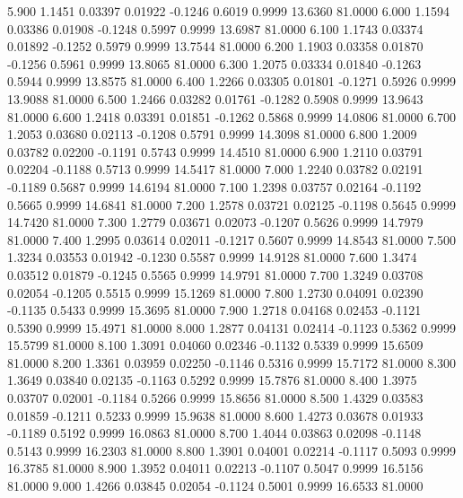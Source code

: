    5.900   1.1451   0.03397   0.01922  -0.1246   0.6019   0.9999  13.6360  81.0000
   6.000   1.1594   0.03386   0.01908  -0.1248   0.5997   0.9999  13.6987  81.0000
   6.100   1.1743   0.03374   0.01892  -0.1252   0.5979   0.9999  13.7544  81.0000
   6.200   1.1903   0.03358   0.01870  -0.1256   0.5961   0.9999  13.8065  81.0000
   6.300   1.2075   0.03334   0.01840  -0.1263   0.5944   0.9999  13.8575  81.0000
   6.400   1.2266   0.03305   0.01801  -0.1271   0.5926   0.9999  13.9088  81.0000
   6.500   1.2466   0.03282   0.01761  -0.1282   0.5908   0.9999  13.9643  81.0000
   6.600   1.2418   0.03391   0.01851  -0.1262   0.5868   0.9999  14.0806  81.0000
   6.700   1.2053   0.03680   0.02113  -0.1208   0.5791   0.9999  14.3098  81.0000
   6.800   1.2009   0.03782   0.02200  -0.1191   0.5743   0.9999  14.4510  81.0000
   6.900   1.2110   0.03791   0.02204  -0.1188   0.5713   0.9999  14.5417  81.0000
   7.000   1.2240   0.03782   0.02191  -0.1189   0.5687   0.9999  14.6194  81.0000
   7.100   1.2398   0.03757   0.02164  -0.1192   0.5665   0.9999  14.6841  81.0000
   7.200   1.2578   0.03721   0.02125  -0.1198   0.5645   0.9999  14.7420  81.0000
   7.300   1.2779   0.03671   0.02073  -0.1207   0.5626   0.9999  14.7979  81.0000
   7.400   1.2995   0.03614   0.02011  -0.1217   0.5607   0.9999  14.8543  81.0000
   7.500   1.3234   0.03553   0.01942  -0.1230   0.5587   0.9999  14.9128  81.0000
   7.600   1.3474   0.03512   0.01879  -0.1245   0.5565   0.9999  14.9791  81.0000
   7.700   1.3249   0.03708   0.02054  -0.1205   0.5515   0.9999  15.1269  81.0000
   7.800   1.2730   0.04091   0.02390  -0.1135   0.5433   0.9999  15.3695  81.0000
   7.900   1.2718   0.04168   0.02453  -0.1121   0.5390   0.9999  15.4971  81.0000
   8.000   1.2877   0.04131   0.02414  -0.1123   0.5362   0.9999  15.5799  81.0000
   8.100   1.3091   0.04060   0.02346  -0.1132   0.5339   0.9999  15.6509  81.0000
   8.200   1.3361   0.03959   0.02250  -0.1146   0.5316   0.9999  15.7172  81.0000
   8.300   1.3649   0.03840   0.02135  -0.1163   0.5292   0.9999  15.7876  81.0000
   8.400   1.3975   0.03707   0.02001  -0.1184   0.5266   0.9999  15.8656  81.0000
   8.500   1.4329   0.03583   0.01859  -0.1211   0.5233   0.9999  15.9638  81.0000
   8.600   1.4273   0.03678   0.01933  -0.1189   0.5192   0.9999  16.0863  81.0000
   8.700   1.4044   0.03863   0.02098  -0.1148   0.5143   0.9999  16.2303  81.0000
   8.800   1.3901   0.04001   0.02214  -0.1117   0.5093   0.9999  16.3785  81.0000
   8.900   1.3952   0.04011   0.02213  -0.1107   0.5047   0.9999  16.5156  81.0000
   9.000   1.4266   0.03845   0.02054  -0.1124   0.5001   0.9999  16.6533  81.0000
